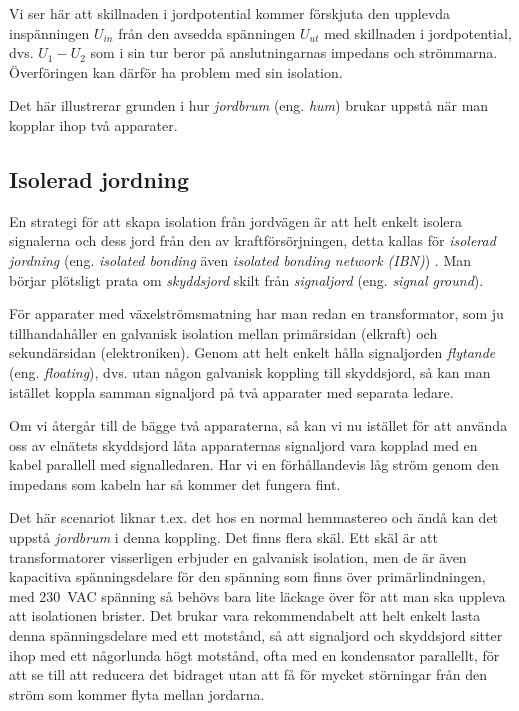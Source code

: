 Vi ser här att skillnaden i jordpotential kommer förskjuta den upplevda
inspänningen \(U_{in}\) från den avsedda spänningen \(U_{ut}\) med skillnaden i
jordpotential, dvs. \(U_1 - U_2\) som i sin tur beror på anslutningarnas 
impedans och strömmarna. Överföringen kan därför ha problem med sin isolation.

Det här illustrerar grunden i hur \emph{jordbrum} (eng. \emph{hum}) brukar
uppstå när man kopplar ihop två apparater.

\subsection{Isolerad jordning}

En strategi för att skapa isolation från jordvägen är att helt enkelt
isolera signalerna och dess jord från den av kraftförsörjningen, detta kallas
för \emph{isolerad jordning} (eng. \emph{isolated bonding} även \emph{isolated
	bonding network (IBN)}) \cite[3.2.4]{K27-1991}.
Man börjar plötsligt prata om \emph{skyddsjord} skilt från \emph{signaljord}
(eng. \emph{signal ground}).

För apparater med växelströmsmatning har man redan en transformator, som ju
tillhandahåller en galvanisk isolation mellan primärsidan (elkraft) och
sekundärsidan (elektroniken). Genom att helt enkelt hålla signaljorden
\emph{flytande} (eng. \emph{floating}), dvs. utan någon galvanisk koppling
till skyddsjord, så kan man istället koppla samman signaljord på två apparater
med separata ledare.

Om vi återgår till de bägge två apparaterna, så kan vi nu istället för att
använda oss av elnätets skyddsjord låta apparaternas signaljord vara kopplad
med en kabel parallell med signalledaren. Har vi en förhållandevis låg ström
genom den impedans som kabeln har så kommer det fungera fint.

Det här scenariot liknar t.ex. det hos en normal hemmastereo och ändå kan det
uppstå \emph{jordbrum} i denna koppling. Det finns flera skäl. Ett skäl är att
transformatorer visserligen erbjuder en galvanisk isolation, men de är även
kapacitiva spänningsdelare för den spänning som finns över primärlindningen,
med 230~VAC spänning så behövs bara lite läckage över för att man ska
uppleva att isolationen brister. Det brukar vara rekommendabelt att helt
enkelt lasta denna spänningsdelare med ett motstånd, så att signaljord och
skyddsjord sitter ihop med ett någorlunda högt motstånd, ofta med en
kondensator parallellt, för att se till att reducera det bidraget utan att
få för mycket störningar från den ström som kommer flyta mellan jordarna.

